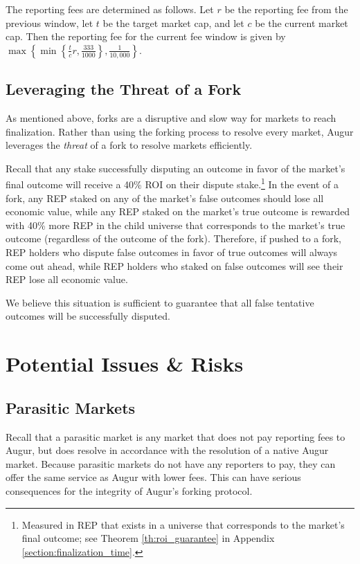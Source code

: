 \documentclass[floatfix,reprint,nofootinbib,amsmath,amssymb,epsfig,pre,floats,letterpaper,groupedaffiliation]{revtex4-1}
\theoremstyle{definition}
\theoremstyle{definition}
\begin{document}
The reporting fees are determined as follows.  Let $r$ be the reporting fee from the previous window, let $t$ be the target market cap, and let $c$ be the current market cap.  Then the reporting fee for the current fee window is given by $\max\left\{ \min\left\{\frac{t}{c}r, \frac{333}{1000}\right\} , \frac{1}{10,000}\right\}$.

\subsection{Leveraging the Threat of a Fork}\label{section:leveraging_the_threat_of_a_fork}

As mentioned above, forks are a disruptive and slow way for markets to reach finalization.  Rather than using the forking process to resolve every market, Augur leverages the \textit{threat} of a fork to resolve markets efficiently.

Recall that any stake successfully disputing an outcome in favor of the market's final outcome will receive a 40\% ROI on their dispute stake.\footnote{Measured in REP that exists in a universe that corresponds to the market's final outcome; see Theorem \ref{th:roi_guarantee} in Appendix \ref{section:finalization_time}.}  In the event of a fork, any REP staked on any of the market's false outcomes should lose all economic value, while any REP staked on the market's true outcome is rewarded with 40\% more REP in the child universe that corresponds to the market's true outcome (regardless of the outcome of the fork).  Therefore, if pushed to a fork, REP holders who dispute false outcomes in favor of true outcomes will always come out ahead, while REP holders who staked on false outcomes will see their REP lose all economic value.

We believe this situation is sufficient to guarantee that all false tentative outcomes will be successfully disputed.

\section{Potential Issues \& Risks}

\subsection{Parasitic Markets}

Recall that a parasitic market is any market that does not pay reporting fees to Augur, but does resolve in accordance with the resolution of a native Augur market. Because parasitic markets do not have any reporters to pay, they can offer the same service as Augur with lower fees. This can have serious consequences for the integrity of Augur's forking protocol.
\end{document}
